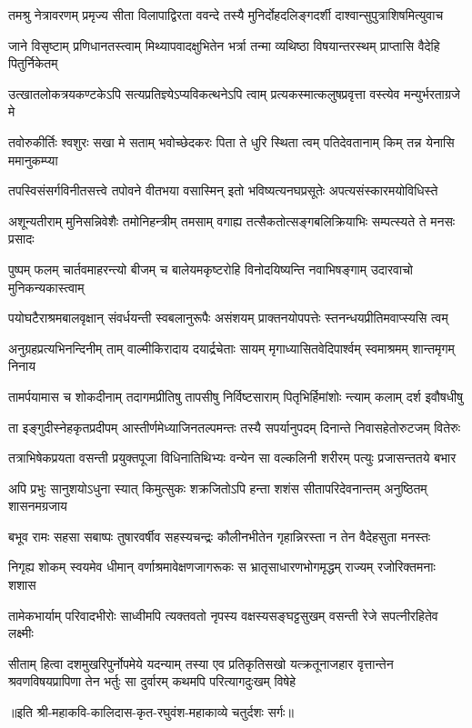 \fourlineindentedshloka
{तमश्रु नेत्रावरणम् प्रमृज्य}
{सीता विलापाद्विरता ववन्दे}
{तस्यै मुनिर्दोहदलिङ्गदर्शी}
{दाश्वान्सुपुत्राशिषमित्युवाच} %

\fourlineindentedshloka
{जाने विसृष्टाम् प्रणिधानतस्त्वाम्}
{मिथ्यापवादक्षुभितेन भर्त्रा}
{तन्मा व्यथिष्ठा विषयान्तरस्थम्}
{प्राप्तासि वैदेहि पितुर्निकेतम्} %

\fourlineindentedshloka
{उत्खातलोकत्रयकण्टकेऽपि}
{सत्यप्रतिज्ञ्येऽप्यविकत्थनेऽपि}
{त्वाम् प्रत्यकस्मात्कलुषप्रवृत्ता}
{वस्त्येव मन्युर्भरताग्रजे मे} %

\fourlineindentedshloka
{तवोरुकीर्तिः श्वशुरः सखा मे}
{सताम् भवोच्छेदकरः पिता ते}
{धुरि स्थिता त्वम् पतिदेवतानाम्}
{किम् तन्न येनासि ममानुकम्प्या} %

\fourlineindentedshloka
{तपस्विसंसर्गविनीतसत्त्वे}
{तपोवने वीतभया वसास्मिन्}
{इतो भविष्यत्यनघप्रसूतेः}
{अपत्यसंस्कारमयोविधिस्ते} %

\fourlineindentedshloka
{अशून्यतीराम् मुनिसन्निवेशैः}
{तमोनिहन्त्रीम् तमसाम् वगाह्य}
{तत्सैकतोत्सङ्गबलिक्रियाभिः}
{सम्पत्स्यते ते मनसः प्रसादः} %

\fourlineindentedshloka
{पुष्पम् फलम् चार्तवमाहरन्त्यो}
{बीजम् च बालेयमकृष्टरोहि}
{विनोदयिष्यन्ति नवाभिषङ्गाम्}
{उदारवाचो मुनिकन्यकास्त्वाम्} %

\fourlineindentedshloka
{पयोघटैराश्रमबालवृक्षान्}
{संवर्धयन्ती स्वबलानुरूपैः}
{असंशयम् प्राक्तनयोपपत्तेः}
{स्तनन्धयप्रीतिमवाप्स्यसि त्वम्} %

\fourlineindentedshloka
{अनुग्रहप्रत्यभिनन्दिनीम् ताम्}
{वाल्मीकिरादाय दयार्द्रचेताः}
{सायम् मृगाध्यासितवेदिपार्श्वम्}
{स्वमाश्रमम् शान्तमृगम् निनाय} %

\fourlineindentedshloka
{तामर्पयामास च शोकदीनाम्}
{तदागमप्रीतिषु तापसीषु}
{निर्विष्टसाराम् पितृभिर्हिमांशोः}
{न्त्याम् कलाम् दर्श इवौषधीषु} %

\fourlineindentedshloka
{ता इङ्गुदीस्नेहकृतप्रदीपम्}
{आस्तीर्णमेध्याजिनतल्पमन्तः}
{तस्यै सपर्यानुपदम् दिनान्ते}
{निवासहेतोरुटजम् वितेरुः} %

\fourlineindentedshloka
{तत्राभिषेकप्रयता वसन्ती}
{प्रयुक्तपूजा विधिनातिथिभ्यः}
{वन्येन सा वल्कलिनी शरीरम्}
{पत्युः प्रजासन्ततये बभार} %

\fourlineindentedshloka
{अपि प्रभुः सानुशयोऽधुना स्यात्}
{किमुत्सुकः शक्रजितोऽपि हन्ता}
{शशंस सीतापरिदेवनान्तम्}
{अनुष्ठितम् शासनमग्रजाय} %

\fourlineindentedshloka
{बभूव रामः सहसा सबाष्पः}
{तुषारवर्षीव सहस्यचन्द्रः}
{कौलीनभीतेन गृहान्निरस्ता}
{न तेन वैदेहसुता मनस्तः} %

\fourlineindentedshloka
{निगृह्य शोकम् स्वयमेव धीमान्}
{वर्णाश्रमावेक्षणजागरूकः}
{स भ्रातृसाधारणभोगमृद्धम्}
{राज्यम् रजोरिक्तमनाः शशास} %

\fourlineindentedshloka
{तामेकभार्याम् परिवादभीरोः}
{साध्वीमपि त्यक्तवतो नृपस्य}
{वक्षस्यसङ्घट्टसुखम् वसन्ती}
{रेजे सपत्नीरहितेव लक्ष्मीः} %

\fourlineindentedshloka
{सीताम् हित्वा दशमुखरिपुर्नोपमेये यदन्याम्}
{तस्या एव प्रतिकृतिसखो यत्क्रतूनाजहार}
{वृत्तान्तेन श्रवणविषयप्रापिणा तेन भर्तुः}
{सा दुर्वारम् कथमपि परित्यागदुःखम् विषेहे} %

॥इति श्री-महाकवि-कालिदास-कृत-रघुवंश-महाकाव्ये चतुर्दशः सर्गः॥
